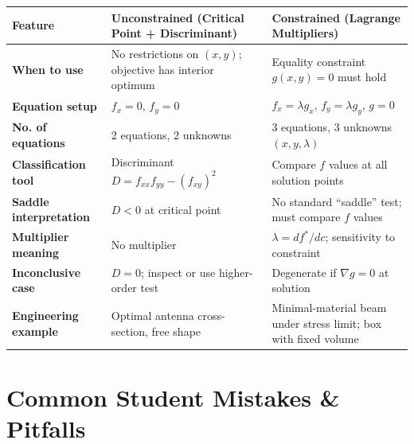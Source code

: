 \documentclass[12pt,a4paper]{article}
\begin{document}
\begin{center}
\begin{tabular}{@{}p{3cm}p{5cm}p{5cm}@{}}
\toprule
\textbf{Feature} & \textbf{Unconstrained (Critical Point + Discriminant)} & \textbf{Constrained (Lagrange Multipliers)} \\
\midrule
\textbf{When to use} & No restrictions on $(x,y)$; objective has interior optimum & Equality constraint $g(x,y)=0$ must hold \\
\midrule
\textbf{Equation setup} & $f_x = 0$, $f_y = 0$ & $f_x = \lambda g_x$, $f_y = \lambda g_y$, $g = 0$ \\
\midrule
\textbf{No. of equations} & 2 equations, 2 unknowns & 3 equations, 3 unknowns $(x,y,\lambda)$ \\
\midrule
\textbf{Classification tool} & Discriminant $D = f_{xx}f_{yy}-(f_{xy})^2$ & Compare $f$ values at all solution points \\
\midrule
\textbf{Saddle interpretation} & $D < 0$ at critical point & No standard ``saddle'' test; must compare $f$ values \\
\midrule
\textbf{Multiplier meaning} & No multiplier & $\lambda = df^*/dc$; sensitivity to constraint \\
\midrule
\textbf{Inconclusive case} & $D = 0$; inspect or use higher-order test & Degenerate if $\nabla g = 0$ at solution \\
\midrule
\textbf{Engineering example} & Optimal antenna cross-section, free shape & Minimal-material beam under stress limit; box with fixed volume \\
\bottomrule
\end{tabular}
\end{center}

\section{Common Student Mistakes \& Pitfalls}
\end{document}
